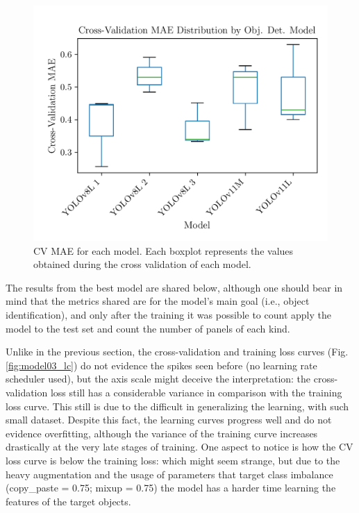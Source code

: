 \documentclass[conference]{IEEEtran}
\begin{document}
\begin{figure}[H]
    \centering
    \includegraphics[width=1\linewidth]{assets/model03_mae_boxplot.png}
    \caption{CV MAE for each model. Each boxplot represents the values obtained during the cross validation of each model.}
    \label{fig:model03_mae_boxplot}
\end{figure}

The results from the best model are shared below, although one should bear in mind that the metrics shared are for the model's main goal (i.e., object identification), and only after the training it was possible to count apply the model to the test set and count the number of panels of each kind.

Unlike in the previous section, the cross-validation and training loss curves (Fig. \ref{fig:model03_lc}) do not evidence the spikes seen before (no learning rate scheduler used), but the axis scale might deceive the interpretation: the cross-validation loss still has a considerable variance in comparison with the training loss curve. This still is due to the difficult in generalizing the learning, with such small dataset. Despite this fact, the learning curves progress well and do not evidence overfitting, although the variance of the training curve increases drastically at the very late stages of training. One aspect to notice is how the CV loss curve is below the training loss: which might seem strange, but due to the heavy augmentation and the usage of parameters that target class imbalance (copy\_paste = 0.75; mixup = 0.75) the model has a harder time learning the features of the target objects.
\end{document}
